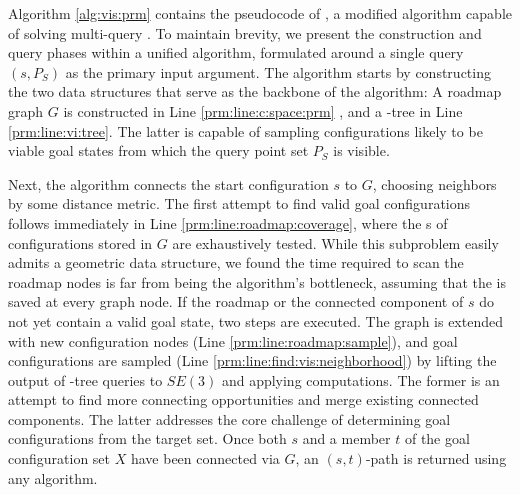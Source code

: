 Algorithm \ref{alg:vis:prm} contains the pseudocode of \visprm, a modified \prm algorithm capable of solving multi-query \tvmp. To maintain brevity, we present the construction and query phases within a unified algorithm, formulated around a single query $(s, P_S)$ as the primary input argument. The algorithm starts by constructing the two data structures that serve as the backbone of the algorithm: A \cspace{} roadmap graph $G$ is constructed in Line \ref{prm:line:c:space:prm} , and a \vi-tree in Line \ref{prm:line:vi:tree}. 
The latter is capable of sampling configurations likely to be viable goal states from which the query point set $P_S$ is visible. %



Next, the algorithm connects the start configuration $s$ to $G$, choosing neighbors by some distance metric.  The first attempt to find valid goal configurations follows immediately in Line \ref{prm:line:roadmap:coverage}, where the \fov{}s of configurations stored in $G$ are exhaustively tested. While this subproblem easily admits a geometric data structure, we found the time required to scan the roadmap nodes is far from being the algorithm's bottleneck, assuming that the \fov is saved at every graph node. If the roadmap or the connected component of $s$ do not yet contain a valid goal state, two steps are executed. The graph is extended with new configuration nodes (Line \ref{prm:line:roadmap:sample}), and goal configurations are sampled (Line \ref{prm:line:find:vis:neighborhood}) by lifting the output of \vi-tree queries to $SE(3)$ and applying \ik computations. The former is an attempt to find more connecting opportunities and merge existing connected components. The latter addresses the core \tvmp challenge of determining goal configurations from the target set.
Once both $s$ and a member $t$ of the goal configuration set $X$ have been connected via $G$, an $(s,t)$-path is returned using any  algorithm. 




